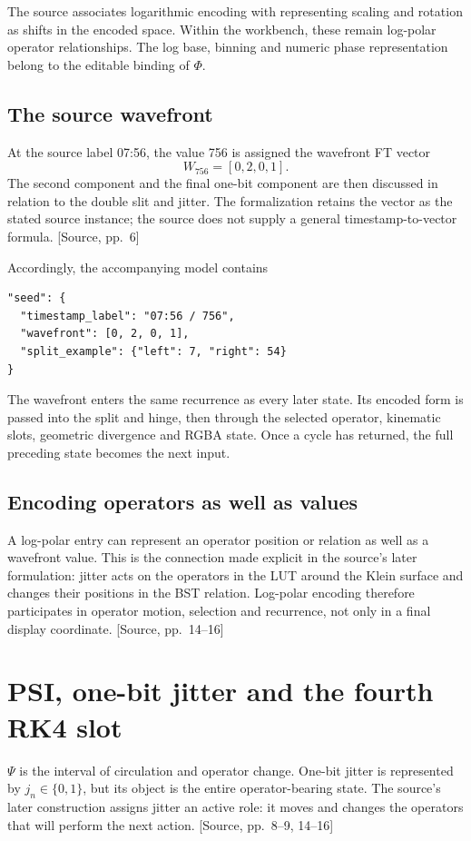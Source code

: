 \documentclass[11pt,a4paper]{article}
\newcommand{\src}[1]{{\sffamily\footnotesize\color{DWGray}[Source, pp.~#1]}}
\begin{document}
The source associates logarithmic encoding with representing scaling and rotation as shifts in the encoded space. Within the workbench, these remain log-polar operator relationships. The log base, binning and numeric phase representation belong to the editable binding of $\Phi$.

\subsection{The source wavefront}
At the source label 07:56, the value 756 is assigned the wavefront FT vector
\begin{equation}
W_{756}=[0,2,0,1].
\end{equation}
The second component and the final one-bit component are then discussed in relation to the double slit and jitter. The formalization retains the vector as the stated source instance; the source does not supply a general timestamp-to-vector formula. \src{6}

Accordingly, the accompanying model contains
\begin{lstlisting}
"seed": {
  "timestamp_label": "07:56 / 756",
  "wavefront": [0, 2, 0, 1],
  "split_example": {"left": 7, "right": 54}
}
\end{lstlisting}

The wavefront enters the same recurrence as every later state. Its encoded form is passed into the split and hinge, then through the selected operator, kinematic slots, geometric divergence and RGBA state. Once a cycle has returned, the full preceding state becomes the next input.

\subsection{Encoding operators as well as values}
A log-polar entry can represent an operator position or relation as well as a wavefront value. This is the connection made explicit in the source's later formulation: jitter acts on the operators in the LUT around the Klein surface and changes their positions in the BST relation. Log-polar encoding therefore participates in operator motion, selection and recurrence, not only in a final display coordinate. \src{14--16}
\clearpage

\section{PSI, one-bit jitter and the fourth RK4 slot}
$\Psi$ is the interval of circulation and operator change. One-bit jitter is represented by $j_n\in\{0,1\}$, but its object is the entire operator-bearing state. The source's later construction assigns jitter an active role: it moves and changes the operators that will perform the next action. \src{8--9, 14--16}
\end{document}
